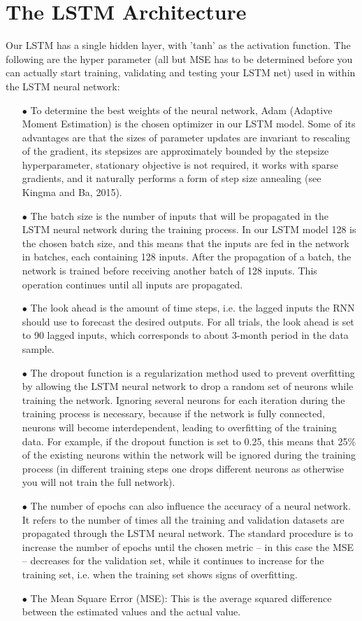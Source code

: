 \documentclass[a4paper,11pt,oneside]{book}
\begin{document}
\section{The LSTM Architecture}
Our LSTM has a single hidden layer,  with 'tanh' as the activation function. The following are the hyper parameter (all but MSE has to be determined before you can actually start training, validating and testing your LSTM net) used in within the LSTM neural network:
\begin{itemize}

\item[$\bullet$]   
To determine the best weights of the neural network, Adam (Adaptive Moment Estimation) is the chosen optimizer in our LSTM model. Some of its advantages are that the sizes of parameter updates are invariant to
rescaling of the gradient, its stepsizes are approximately bounded by the stepsize hyperparameter, stationary objective is not required, it works with sparse gradients, and it naturally performs a
form of step size annealing (see Kingma and Ba, 2015).
\item[$\bullet$] The batch size is the number of inputs that will be propagated in the
LSTM neural network during the training process. In our LSTM model 128 is the chosen batch size, and this means that the inputs are
fed in the network in batches, each containing 128 inputs. After
the propagation of a batch, the network is trained before receiving another
batch of 128 inputs. This operation continues until all inputs are propagated.
\item[$\bullet$] The look ahead is the amount of time steps, i.e. the lagged
inputs the RNN should use to forecast the desired outputs. For all trials, the look ahead is set to 90 lagged inputs, which
corresponds to about 3-month period in the data sample.
\item[$\bullet$] The dropout function is a regularization method used to prevent overfitting by
allowing the LSTM neural network to drop a random set of neurons while
training the network. Ignoring several neurons for each iteration during the
training process is necessary, because if the network is fully connected,
neurons will become interdependent, leading to overfitting of the training data. For example, if the dropout function is set to 0.25, this means that 25\% of the existing
neurons within the network will be ignored during the training process (in different training steps one drops different neurons as otherwise you will not train the full network).
\item[$\bullet$] The number of epochs can also influence the accuracy of a neural network. It
refers to the number of times all the training and validation datasets are
propagated through the LSTM neural network. The standard procedure is to
increase the number of epochs until the chosen metric – in this case the MSE
– decreases for the validation set, while it continues to increase for the training
set, i.e. when the training set shows signs of overfitting.
\item[$\bullet$] The Mean Square Error (MSE): This is the average squared difference between the estimated values and the actual value.
\end{itemize}
\end{document}
